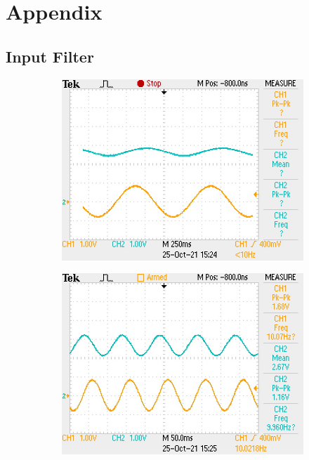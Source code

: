 \documentclass[a4paper,11pt]{article}
\begin{document}
\clearpage
\section*{Appendix}
\subsection*{Input Filter}
\begin{figure}[h!]
  \centering
  \begin{subfigure}{0.3\textwidth}
    \includegraphics[width=\columnwidth]{input_filter/input_1Hz.JPG}
  \end{subfigure}
  \begin{subfigure}{0.3\textwidth}
    \includegraphics[width=\columnwidth]{input_filter/input_10Hz.JPG}

\end{subfigure}
\end{figure}
\end{document}
